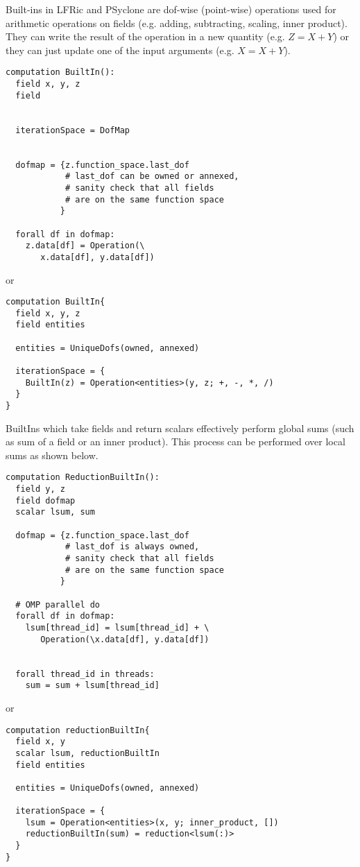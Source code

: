\documentclass{report}
\begin{document}
Built-ins in LFRic and PSyclone are dof-wise (point-wise) operations
used for arithmetic operations on fields (e.g. adding, subtracting, 
scaling, inner product). They can write the result of the operation 
in a new quantity (e.g. $Z = X + Y$) or they can just
update one of the input arguments (e.g. $X = X + Y$).

\begin{lstlisting}[style=dsl]
computation BuiltIn():
  field x, y, z
  field
  
  
  iterationSpace = DofMap
  
  
  dofmap = {z.function_space.last_dof
            # last_dof can be owned or annexed,
            # sanity check that all fields
            # are on the same function space
           }
  
  forall df in dofmap:
    z.data[df] = Operation(\ 
       x.data[df], y.data[df])

\end{lstlisting}

or

\begin{lstlisting}[style=dsl]
computation BuiltIn{
  field x, y, z
  field entities
  
  entities = UniqueDofs(owned, annexed)
  
  iterationSpace = {
    BuiltIn(z) = Operation<entities>(y, z; +, -, *, /)
  }
}
\end{lstlisting}

BuiltIns which take fields and return scalars effectively 
perform global sums (such as sum of a field or an inner product).
This process can be performed over local sums as shown below.
\begin{lstlisting}[style=dsl]
computation ReductionBuiltIn():
  field y, z
  field dofmap
  scalar lsum, sum
  
  dofmap = {z.function_space.last_dof
            # last_dof is always owned,
            # sanity check that all fields
            # are on the same function space
           }
  
  # OMP parallel do
  forall df in dofmap:
    lsum[thread_id] = lsum[thread_id] + \
       Operation(\x.data[df], y.data[df])
       
   
  forall thread_id in threads:
    sum = sum + lsum[thread_id] 

\end{lstlisting}

or

\begin{lstlisting}[style=dsl]
computation reductionBuiltIn{
  field x, y
  scalar lsum, reductionBuiltIn
  field entities
  
  entities = UniqueDofs(owned, annexed)
  
  iterationSpace = {
    lsum = Operation<entities>(x, y; inner_product, [])
    reductionBuiltIn(sum) = reduction<lsum(:)>
  }                  
}
\end{lstlisting}
\end{document}
